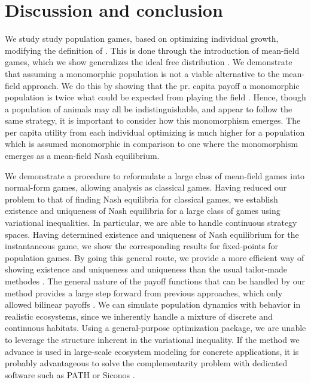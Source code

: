\section{Discussion and conclusion}

We study study population games, based on optimizing individual growth, modifying the definition of \citep{vincent2005evolutionary}. This is done through the introduction of mean-field games, which we show generalizes the ideal free distribution \citep{fretwell1969territorial}. We demonstrate that assuming a monomorphic population is not a viable alternative to the mean-field approach. We do this by showing that the pr. capita payoff a monomorphic population is twice what could be expected from playing the field  \citep{parker1978searching} . Hence, though a population of animals may all be indistinguishable, and appear to follow the same strategy, it is important to consider how this monomorphism emerges. The per capita utility from each individual optimizing is much higher for a population which is assumed monomorphic in comparison to one where the monomorphism emerges as a mean-field Nash equilibrium.


We demonstrate a procedure to reformulate a large class of mean-field games into normal-form games, allowing analysis as classical games. Having reduced our problem to that of finding Nash equilibria for classical games, we establish existence and uniqueness of Nash equilibria for a large class of games using variational inequalities. In particular, we are able to handle continuous strategy spaces. Having determined existence and uniqueness of Nash equilibrium for the instantaneous game, we show the corresponding results for fixed-points for population games. By going this general route, we provide a more efficient way of showing existence and uniqueness and uniqueness than the usual tailor-made methodes \citep{cressman2010ideal,kvrivan2009evolutionary}. The general nature of the payoff functions that can be handled by our method provides a large step forward from previous approaches, which only allowed bilinear payoffs \citep{mariani2016migration, pinti2021co}. We can simulate population dynamics with behavior in realistic ecosystems, since we inherently handle a mixture of discrete and continuous habitats. Using a general-purpose optimization package, we are unable to leverage the structure inherent in the variational inequality. If the method we advance is used in large-scale ecosystem modeling for concrete applications, it is probably advantageous to solve the complementarity problem with dedicated software such as PATH or Siconos \citep{dirkse1995path, acary2019introduction}.



